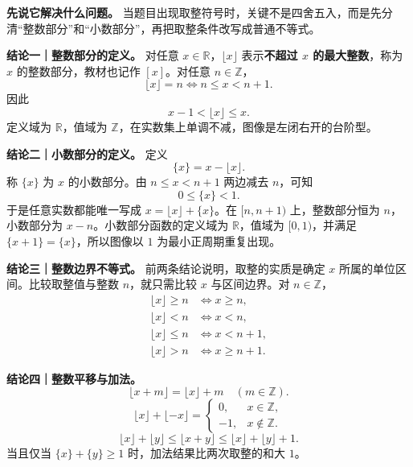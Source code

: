 \begin{statementbox}
\textbf{先说它解决什么问题。} 当题目出现取整符号时，关键不是四舍五入，而是先分清“整数部分”和“小数部分”，再把取整条件改写成普通不等式。

\textbf{结论一｜整数部分的定义。} 对任意 $x\in\mathbb R$，$\lfloor x\rfloor$ 表示\textbf{不超过 $x$ 的最大整数}，称为 $x$ 的整数部分，教材也记作 $[x]$。对任意 $n\in\mathbb Z$，
\[\boxed{\lfloor x\rfloor=n\iff n\le x<n+1.}\]
因此
\[x-1<\lfloor x\rfloor\le x.\]
定义域为 $\mathbb R$，值域为 $\mathbb Z$，在实数集上单调不减，图像是左闭右开的台阶型。


\textbf{结论二｜小数部分的定义。} 定义
\[\boxed{\{x\}=x-\lfloor x\rfloor.}\]
称 $\{x\}$ 为 $x$ 的小数部分。由 $n\le x<n+1$ 两边减去 $n$，可知
\[\boxed{0\le \{x\}<1.}\]
于是任意实数都能唯一写成 $x=\lfloor x\rfloor+\{x\}$。在 $[n,n+1)$ 上，整数部分恒为 $n$，小数部分为 $x-n$。小数部分函数的定义域为 $\mathbb R$，值域为 $[0,1)$，并满足 $\{x+1\}=\{x\}$，所以图像以 $1$ 为最小正周期重复出现。


\textbf{结论三｜整数边界不等式。} 前两条结论说明，取整的实质是确定 $x$ 所属的单位区间。比较取整值与整数 $n$，就只需比较 $x$ 与区间边界。对 $n\in\mathbb Z$，
\[\begin{aligned}
\lfloor x\rfloor\ge n&\iff x\ge n,\\
\lfloor x\rfloor<n&\iff x<n,\\
\lfloor x\rfloor\le n&\iff x<n+1,\\
\lfloor x\rfloor>n&\iff x\ge n+1.
\end{aligned}\]

\textbf{结论四｜整数平移与加法。}
\[\boxed{\lfloor x+m\rfloor=\lfloor x\rfloor+m\quad(m\in\mathbb Z).}\]
\[\lfloor x\rfloor+\lfloor-x\rfloor=\begin{cases}0,&x\in\mathbb Z,\\-1,&x\notin\mathbb Z.\end{cases}\]
\[\boxed{\lfloor x\rfloor+\lfloor y\rfloor\le\lfloor x+y\rfloor\le\lfloor x\rfloor+\lfloor y\rfloor+1.}\]
当且仅当 $\{x\}+\{y\}\ge1$ 时，加法结果比两次取整的和大 $1$。
\end{statementbox}
